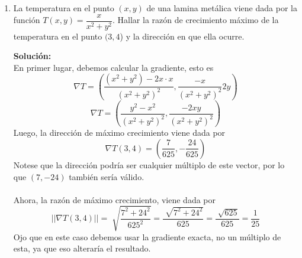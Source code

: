 \documentclass[12pt]{article}
\newenvironment{solucion}
{\begin{mdframed}[backgroundcolor=black!10]
		{\bf Solución:}\\
	}
	{
	\end{mdframed}
}
\newenvironment{preguntas}
{\begin{enumerate}\itemsep12pt
	}
	{
	\end{enumerate}
}
\begin{document}
\begin{preguntas}
\begin{solucion}
$$D_{(5,12)}(1,1) = \begin{pmatrix}f_x(1,1) \\ f_y(1,1)\end{pmatrix} \cdot \begin{pmatrix}\frac{5}{13} \\ \frac{12}{13}\end{pmatrix} = -1$$
$$\dfrac{5}{13}f_x(1,1) + \dfrac{12}{13}f_y(1,1) = -1$$
$$5f_x(1,1) + 12f_y(1,1) = -13$$
Resolviendo este sistema de ecuaciones, obtenemos que
$$f_x(1,1) = 7 \qquad f_y(1,1) = -4$$
\begin{enumerate}[a)]
\item Para obtener el plano tangente, lo podemos hacer con la formula, esto es
$$z - f(1,1) = f_x(1,1)(x-1) + f_y(1,1)(y-1)$$
$$z - f(1,1) = 7(x-1) - 4(y-1)$$
$$7x - 4y - z = 3 - f(1,1)$$
\item $D_{(1,1)}(1,1) = \begin{pmatrix}f_x(1,1) \\ f_y(1,1)\end{pmatrix} \cdot \begin{pmatrix}-\frac{1}{\sqrt[]{2}} \\ -\frac{1}{\sqrt[]{2}}\end{pmatrix}
= \begin{pmatrix}7 \\ -4\end{pmatrix} \cdot \begin{pmatrix}-\frac{1}{\sqrt[]{2}} \\ -\frac{1}{\sqrt[]{2}}\end{pmatrix}
= -\frac{3}{\sqrt[]{2}}$
\end{enumerate}
\end{solucion}
\item La temperatura en el punto $(x,y)$ de una lamina metálica viene dada por la función $T(x,y) = \dfrac{x}{x^2+y^2}$. Hallar la razón de crecimiento máximo de la temperatura en el punto $(3,4$) y la dirección en que ella ocurre.
\begin{solucion}
En primer lugar, debemos calcular la gradiente, esto es
$$\nabla T = \left( 
\dfrac{(x^2+y^2) - 2x\cdot x}{(x^2+y^2)^2}, 
\dfrac{-x}{(x^2+y^2)^2}2y
\right)$$
$$\nabla T = \left( 
\dfrac{y^2 - x^2}{(x^2+y^2)^2}, 
\dfrac{-2xy}{(x^2+y^2)^2}
\right)$$
Luego, la dirección de máximo crecimiento viene dada por
$$\nabla T(3,4) = \left( 
\dfrac{7}{625}, 
-\dfrac{24}{625}
\right)$$
Notese que la dirección podría ser cualquier múltiplo de este vector, por lo que $(7,-24)$ también sería válido.\\
\\
Ahora, la razón de máximo crecimiento, viene dada por
$$||\nabla T(3,4)|| 
= \sqrt[]{\dfrac{7^2 + 24^2}{625^2}}
= \dfrac{\sqrt[]{7^2 + 24^2}}{625}
= \dfrac{\sqrt[]{625}}{625}
= \dfrac{1}{25}$$
Ojo que en este caso debemos usar la gradiente exacta, no un múltiplo de esta, ya que eso alteraría el resultado.\\


\end{solucion}
\end{preguntas}
\end{document}
